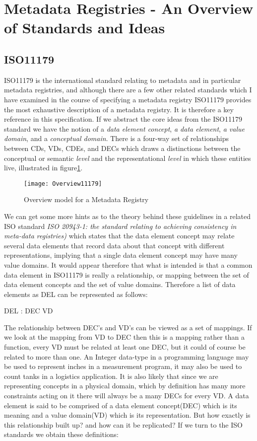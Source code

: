 \section{Metadata Registries - An Overview of Standards and Ideas}
\subsection{ISO11179}
ISO11179 is the international standard relating to metadata and in particular metadata registries, and although there are a few other related standards which I have examined in the course of specifying a metadata registry ISO11179 provides the most exhaustive description of a metadata registry. It is therefore a key reference in this specification. If we abstract the core ideas from the ISO11179 standard we have the notion of a \emph{data element concept}, \emph{a data element}, \emph{a value domain}, and a \emph{conceptual domain}. There is a four-way set of relationships between CDs, VDs, CDEs, and DECs which draws a distinctions between the conceptual or semantic \emph{level} and the representational \emph{level} in which these entities live, illustrated in figure\ref{fig:overviewMDR}.


\begin{figure}[here]
	\texttt{[image: Overview11179]}
	\caption{Overview model for a Metadata Registry} 
	\label{fig:overviewMDR}
\end{figure}

We can get some more hints as to the theory behind these guidelines in a related ISO standard \emph{ISO 20943-1: the standard relating to achieving consistency in meta-data registries)} which states that the data element concept may relate several data elements that record data about that concept with different representations, implying that a single data element concept may have many value domains. It would appear therefore that what is intended is that a common data element in ISO11179 is really a relationship, or mapping between the set of data element concepts and the set of value domains. Therefore a list of data elements as DEL can be represented as follows:
\vskip 4mm
\begin{axdef}DEL : DEC \rel VD\end{axdef}
\vskip 4mm
The relationship between DEC's and VD's can be viewed as a set of mappings. If we look at the mapping from VD to DEC then this is a mapping rather than a function, every VD must be related at least one DEC, but it could of course be related to more than one.  An Integer data-type in a programming language may be used to represent inches in a measurement program, it may also be used to count tanks in a logistics application. It is also likely that since we are representing concepts in a physical domain, which by definition has many more constraints acting on it there will always be a many DECs for every VD.
A data element is said to be comprised of a data element concept(DEC) which is its meaning and a value domain(VD) which is its representation. But how exactly is this relationship built up? and how can it be replicated? 
If we turn to the ISO standards we obtain these definitions:
\vskip 4mm 

